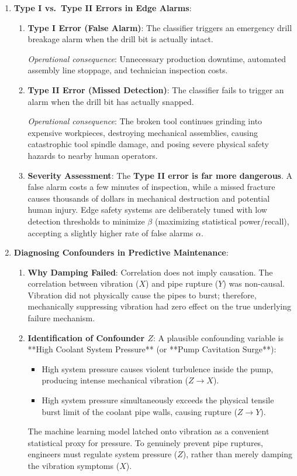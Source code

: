 \begin{enumerate}
    \item \textbf{Type I vs.\ Type II Errors in Edge Alarms}:
    \begin{enumerate}[label=(\alph*)]
        \item \textbf{Type I Error (False Alarm)}: The classifier triggers an emergency drill breakage alarm when the drill bit is actually intact. 
        
        \textit{Operational consequence}: Unnecessary production downtime, automated assembly line stoppage, and technician inspection costs.
        \item \textbf{Type II Error (Missed Detection)}: The classifier fails to trigger an alarm when the drill bit has actually snapped. 
        
        \textit{Operational consequence}: The broken tool continues grinding into expensive workpieces, destroying mechanical assemblies, causing catastrophic tool spindle damage, and posing severe physical safety hazards to nearby human operators.
        \item \textbf{Severity Assessment}: The \textbf{Type II error is far more dangerous}. A false alarm costs a few minutes of inspection, while a missed fracture causes thousands of dollars in mechanical destruction and potential human injury. Edge safety systems are deliberately tuned with low detection thresholds to minimize $\beta$ (maximizing statistical power/recall), accepting a slightly higher rate of false alarms $\alpha$.
    \end{enumerate}

    \item \textbf{Diagnosing Confounders in Predictive Maintenance}:
    \begin{enumerate}[label=(\alph*)]
        \item \textbf{Why Damping Failed}:
        Correlation does not imply causation. The correlation between vibration ($X$) and pipe rupture ($Y$) was non-causal. Vibration did not physically cause the pipes to burst; therefore, mechanically suppressing vibration had zero effect on the true underlying failure mechanism.
        \item \textbf{Identification of Confounder $Z$}:
        A plausible confounding variable is **High Coolant System Pressure** (or **Pump Cavitation Surge**):
        \begin{itemize}
            \item High system pressure causes violent turbulence inside the pump, producing intense mechanical vibration ($Z \to X$).
            \item High system pressure simultaneously exceeds the physical tensile burst limit of the coolant pipe walls, causing rupture ($Z \to Y$).
        \end{itemize}
        The machine learning model latched onto vibration as a convenient statistical proxy for pressure. To genuinely prevent pipe ruptures, engineers must regulate system pressure ($Z$), rather than merely damping the vibration symptoms ($X$).
    \end{enumerate}
\end{enumerate}
